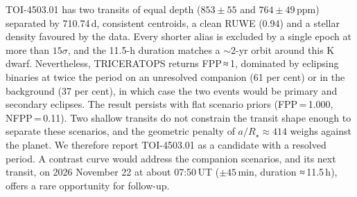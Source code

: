 \documentclass[fleqn,usenatbib]{mnras}
\begin{document}
TOI-4503.01 has two transits of equal depth ($853 \pm 55$ and $764 \pm 49$\,ppm) separated by 710.74\,d, consistent centroids, a clean RUWE (0.94) and a stellar density favoured by the data. Every shorter alias is excluded by a single epoch at more than $15\sigma$, and the 11.5-h duration matches a ${\sim}2$-yr orbit around this K dwarf. Nevertheless, TRICERATOPS returns FPP\,≈\,1, dominated by eclipsing binaries at twice the period on an unresolved companion (61 per cent) or in the background (37 per cent), in which case the two events would be primary and secondary eclipses. The result persists with flat scenario priors (FPP\,=\,1.000, NFPP\,=\,0.11). Two shallow transits do not constrain the transit shape enough to separate these scenarios, and the geometric penalty of $a/R_\star \approx 414$ weighs against the planet. We therefore report TOI-4503.01 as a candidate with a resolved period. A contrast curve would address the companion scenarios, and its next transit, on 2026 November 22 at about 07:50\,UT ($\pm 45$\,min, duration ≈\,11.5\,h), offers a rare opportunity for follow-up.
\end{document}
